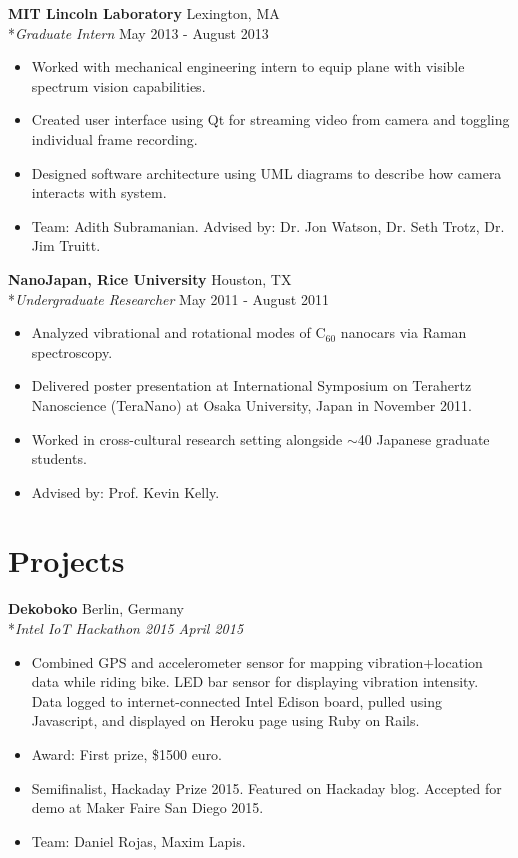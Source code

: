 \documentclass{res}
\begin{document}
 {\bf MIT Lincoln Laboratory} \hfill Lexington, MA
    \\*\emph{Graduate Intern} \hfill May 2013 - August 2013
\begin{itemize}
    \item Worked with mechanical engineering intern to equip plane with visible spectrum vision capabilities. 
    \item Created user interface using Qt for streaming video from camera and toggling individual frame recording.
    \item Designed software architecture using UML diagrams to describe how camera interacts with system.
    \item Team: Adith Subramanian. Advised by: Dr. Jon Watson, Dr. Seth Trotz, Dr. Jim Truitt.
\end{itemize}

    {\bf NanoJapan, Rice University} \hfill Houston, TX
    \\*\emph{Undergraduate Researcher} \hfill May 2011 - August 2011
\begin{itemize}
    \item Analyzed vibrational and rotational modes of C$_{60}$ nanocars via Raman spectroscopy.
    \item Delivered poster presentation at International Symposium on Terahertz Nanoscience (TeraNano) at Osaka University, Japan in November 2011.
    \item Worked in cross-cultural research setting alongside $\sim$40 Japanese graduate students.
    \item Advised by: Prof. Kevin Kelly.
\end{itemize}

  




\section{Projects}

{\bf Dekoboko} \hfill Berlin, Germany
\\*\emph{Intel IoT Hackathon 2015 \hfill April 2015}
	\begin{itemize}
		\item Combined GPS and accelerometer sensor for mapping vibration+location data while riding bike. LED bar sensor for displaying vibration intensity. Data logged to internet-connected Intel Edison board, pulled using Javascript, and displayed on Heroku page using Ruby on Rails.
		\item Award: First prize, \$1500 euro. 
		\item Semifinalist, Hackaday Prize 2015. Featured on Hackaday blog. Accepted for demo at Maker Faire San Diego 2015.
		\item Team: Daniel Rojas, Maxim Lapis.
	\end{itemize}
	
\end{document}
